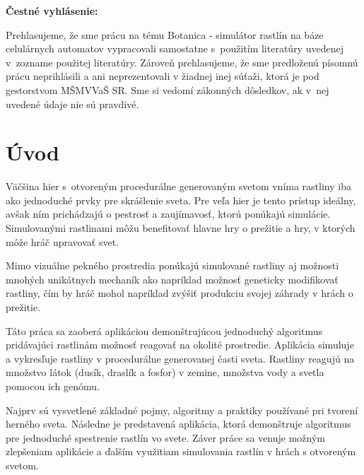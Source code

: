 \documentclass[12pt]{article}
\def\nazovprace{Botanica - simulátor rastlín na báze celulárnych automatov}
\begin{document}
\setcounter{page}{3}


\thispagestyle{empty}

\null
\vfill

\noindent
\textbf{Čestné vyhlásenie:}

Prehlasujeme, že sme prácu na tému
\nazovprace \space
vypracovali samostatne s~použitím literatúry uvedenej v~zozname použitej literatúry.
Zároveň prehlasujeme, že sme predloženú písomnú prácu neprihlásili a ani neprezentovali
v žiadnej inej súťaži, ktorá je pod gestorstvom MŠMVVaŠ SR. Sme si vedomí zákonných dôsledkov,
ak v~nej uvedené údaje nie sú pravdivé.

\vspace{5cm}

\newpage


%
%

% 
% 
% 
% 


\thispagestyle{empty}
\tableofcontents

%
%

\section*{Úvod}

Väčšina hier s~otvoreným procedurálne generovaným svetom vníma rastliny iba ako
jednoduché prvky pre skrášlenie sveta. Pre veľa hier je tento prístup ideálny,
avšak ním prichádzajú o pestrosť a zaujímavosť, ktorú ponúkajú simulácie.
Simulovanými rastlinami môžu benefitovať hlavne hry o prežitie a hry, v ktorých
môže hráč upravovať svet.

Mimo vizuálne pekného prostredia ponúkajú simulované rastliny aj možnosti
mnohých unikátnych mechaník ako napríklad možnosť geneticky
modifikovať rastliny, čím by hráč mohol napríklad zvýšiť produkciu svojej záhrady
v hrách o prežitie.

Táto práca sa zaoberá aplikáciou demonštrujúcou jednoduchý algoritmus
pridávajúci rastlinám možnosť reagovať na okolité prostredie. Aplikácia
simuluje a vykresľuje rastliny v procedurálne generovanej časti sveta.
Rastliny reagujú na množstvo látok (dusík, draslík a fosfor) v zemine,
množstva vody a svetla pomocou ich genómu.

Najprv sú vysvetlené základné pojmy, algoritmy a praktiky používané pri tvorení
herného sveta. Následne je predstavená aplikácia, ktorá demonštruje algoritmus
pre jednoduché spestrenie rastlín vo svete. Záver práce sa venuje možným
zlepšeniam aplikácie a ďalším využitiam simulovania rastlín v hrách
s otvoreným svetom.
\end{document}
